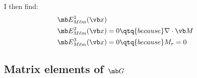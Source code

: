 \documentclass[letterpaper]{article}
\begin{document}
I then find:
\begin{align*}
 \mb E^1_{M\ell m}(\vb x)
\\
 \mb E^2_{M\ell m}(\vb x)&=0  \qtq{because} \nabla \cdot \vb M
\\
 \mb E^3_{M\ell m}(\vb x)&=0  \qtq{because} M_r=0
\end{align*}

\subsection{Matrix elements of $\mb G$}
\end{document}
